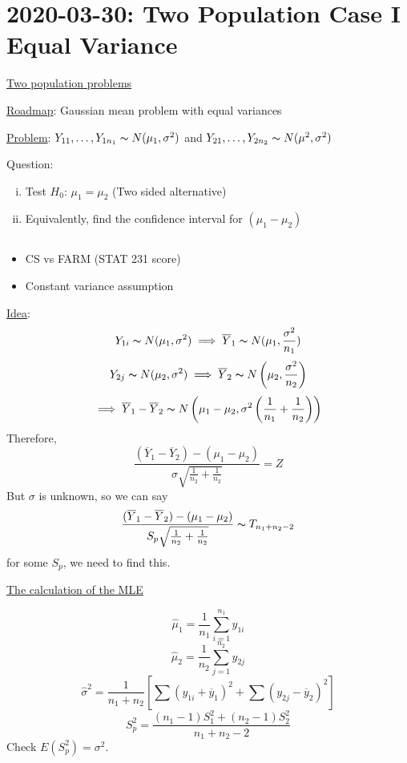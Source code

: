 \section{2020-03-30: Two Population Case I Equal Variance}
\underline{Two population problems}

\underline{Roadmap}: Gaussian mean problem with equal variances

\underline{Problem}: $ Y_{11},\ldots ,Y_{1n_1} \thicksim N(\mu_1,\sigma^2) $ and
$ Y_{21},\ldots ,Y_{2n_2} \thicksim N(\mu^2,\sigma^2) $

Question:
\begin{enumerate}[(i)]
    \item Test $ H_0 $: $ \mu_1=\mu_2 $ (Two sided alternative)
    \item Equivalently, find the confidence interval for $ (\mu_1-\mu_2) $
\end{enumerate}

\begin{exbox}
    \begin{example} $ \; $
        \begin{itemize}
            \item CS vs FARM (STAT 231 score)
            \item Constant variance assumption
        \end{itemize}
    \end{example}
\end{exbox}

\underline{Idea}:
\[ Y_{1i} \thicksim N(\mu_1,\sigma^2)\implies \overline{Y}_1 \thicksim N(\mu_1,\frac{\sigma^2}{n_1} ) \]
\[ Y_{2j} \thicksim N(\mu_2,\sigma^2)\implies \overline{Y}_2 \thicksim N\left( \mu_2,\frac{\sigma^2}{n_2} \right) \]
\[ \implies \overline{Y}_1-\overline{Y}_2
    \thicksim N\left(\mu_1-\mu_2,\sigma^2\left( \frac{1}{n_1} +\frac{1}{n_2} \right)\right) \]
Therefore,
\[ \frac{(\overline{Y}_1-\overline{Y}_2)-(\mu_1-\mu_2)}{\sigma \sqrt{\frac{1}{n_2}+\frac{1}{n_2}}}=Z  \]
But $ \sigma $ is unknown, so we can say
\[ \frac{(\overline{Y}_1-\overline{Y}_2)-(\mu_1-\mu_2)}{S_p\sqrt{\frac{1}{n_2}+\frac{1}{n_2}}}
    \thicksim T_{n_1+n_2-2} \]
for some $ S_p $, we need to find this.

\underline{The calculation of the MLE}

\[ \hat{\mu}_1=\frac{1}{n_1} \sum\limits_{i=1}^{n_1} y_{1i} \]
\[ \hat{\mu}_2=\frac{1}{n_2} \sum\limits_{j=1}^{n_2} y_{2j} \]
\[ \hat{\sigma}^2=\frac{1}{n_1+n_2}\left[ \sum(y_{1i}+\overline{y}_1)^2+ \sum(y_{2j}-\overline{y}_2)^2\right] \]
\[ S_p^2=\frac{(n_1-1)S_1^2+(n_2-1)S_2^2}{n_1+n_2-2} \]
Check $ E(S_p^2)=\sigma^2 $.

